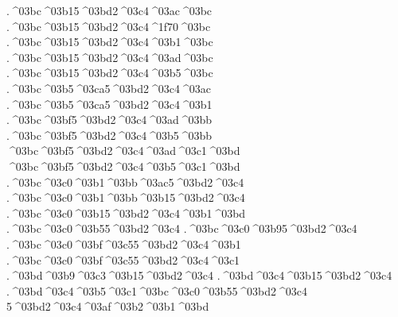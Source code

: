 {.^^^^03bc^^^^03b15^^^^03bd2^^^^03c4^^^^03ac^^^^03bc   %
.^^^^03bc^^^^03b15^^^^03bd2^^^^03c4^^^^1f70^^^^03bc
.^^^^03bc^^^^03b15^^^^03bd2^^^^03c4^^^^03b1^^^^03bc
.^^^^03bc^^^^03b15^^^^03bd2^^^^03c4^^^^03ad^^^^03bc   %
.^^^^03bc^^^^03b15^^^^03bd2^^^^03c4^^^^03b5^^^^03bc
.^^^^03bc^^^^03b5^^^^03ca5^^^^03bd2^^^^03c4^^^^03ac  %
.^^^^03bc^^^^03b5^^^^03ca5^^^^03bd2^^^^03c4^^^^03b1
.^^^^03bc^^^^03bf5^^^^03bd2^^^^03c4^^^^03ad^^^^03bb   %
.^^^^03bc^^^^03bf5^^^^03bd2^^^^03c4^^^^03b5^^^^03bb
^^^^03bc^^^^03bf5^^^^03bd2^^^^03c4^^^^03ad^^^^03c1^^^^03bd   %
^^^^03bc^^^^03bf5^^^^03bd2^^^^03c4^^^^03b5^^^^03c1^^^^03bd
.^^^^03bc^^^^03c0^^^^03b1^^^^03bb^^^^03ac5^^^^03bd2^^^^03c4  %
.^^^^03bc^^^^03c0^^^^03b1^^^^03bb^^^^03b15^^^^03bd2^^^^03c4
.^^^^03bc^^^^03c0^^^^03b15^^^^03bd2^^^^03c4^^^^03b1^^^^03bd   %
.^^^^03bc^^^^03c0^^^^03b55^^^^03bd2^^^^03c4     %
.^^^^03bc^^^^03c0^^^^03b95^^^^03bd2^^^^03c4     %
.^^^^03bc^^^^03c0^^^^03bf^^^^03c55^^^^03bd2^^^^03c4^^^^03b1   %
.^^^^03bc^^^^03c0^^^^03bf^^^^03c55^^^^03bd2^^^^03c4^^^^03c1   %
.^^^^03bd^^^^03b9^^^^03c3^^^^03b15^^^^03bd2^^^^03c4    %
.^^^^03bd^^^^03c4^^^^03b15^^^^03bd2^^^^03c4     %
.^^^^03bd^^^^03c4^^^^03b5^^^^03c1^^^^03bc^^^^03c0^^^^03b55^^^^03bd2^^^^03c4 %
5^^^^03bd2^^^^03c4^^^^03af^^^^03b2^^^^03b1^^^^03bd    %
}
